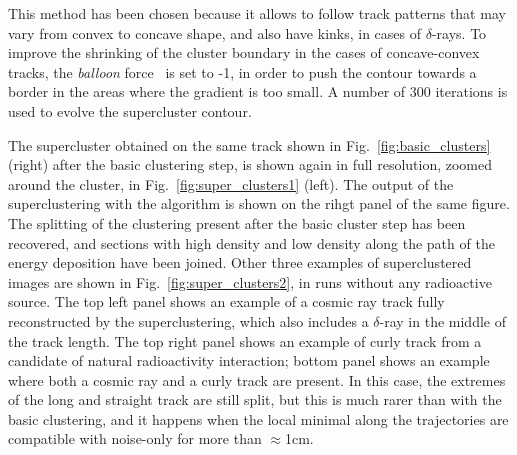 This method has been chosen because it allows to follow track patterns
that may vary from convex to concave shape, and also have kinks, in
cases of $\delta$-rays. To improve the shrinking of the cluster
boundary in the cases of concave-convex tracks, the \textit{balloon}
force~\cite{mgac} is set to -1, in order to push the contour towards a
border in the areas where the gradient is too small. A number of 300
iterations is used to evolve the supercluster contour.

The supercluster obtained on the same track shown in
Fig.~\ref{fig:basic_clusters} (right) after the basic clustering step,
is shown again in full resolution, zoomed around the cluster, in
Fig.~\ref{fig:super_clusters1} (left). The output of the
superclustering with the \gac algorithm is shown on the rihgt panel of
the same figure. The splitting of the clustering present after the
basic cluster step has been recovered, and sections with high density
and low density along the path of the energy deposition have been
joined. Other three examples of superclustered images are shown in
Fig.~\ref{fig:super_clusters2}, in runs without any radioactive
source. The top left panel shows an example of a cosmic ray track
fully reconstructed by the \gac superclustering, which also includes a
$\delta$-ray in the middle of the track length. The top right panel shows an
example of curly track from a candidate of natural radioactivity
interaction; bottom panel shows an example where both a cosmic ray and
a curly track are present. In this case, the extremes of the long and
straight track are still split, but this is much rarer than with the
basic clustering, and it happens when the local minimal along the
trajectories are compatible with noise-only for more than
$\approx$1\unit{cm}.
%
